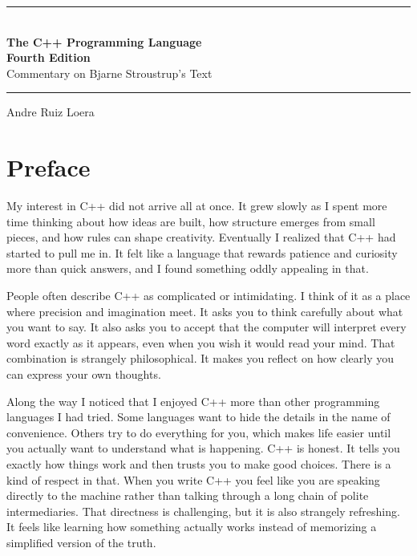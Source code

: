 \documentclass[12pt,letterpaper]{book}
\theoremstyle{definition}
\theoremstyle{remark}
\begin{document}
\begin{titlepage}
\begin{center}

\vspace*{4cm}

\rule{\textwidth}{1.5pt}\\[0.5cm]

{\Huge\bfseries The C++ Programming Language}\\[0.5cm]

{\Large\bfseries Fourth Edition}\\[0.3cm]

{\Large Commentary on Bjarne Stroustrup's Text}\\[0.5cm]

\rule{\textwidth}{1.5pt}

\vfill

{\LARGE Andre Ruiz Loera}

\vspace{3cm}

\end{center}
\end{titlepage}

\chapter*{Preface}

My interest in C++ did not arrive all at once. It grew slowly as I spent more time thinking about how ideas are built, how structure emerges from small pieces, and how rules can shape creativity. Eventually I realized that C++ had started to pull me in. It felt like a language that rewards patience and curiosity more than quick answers, and I found something oddly appealing in that.

People often describe C++ as complicated or intimidating. I think of it as a place where precision and imagination meet. It asks you to think carefully about what you want to say. It also asks you to accept that the computer will interpret every word exactly as it appears, even when you wish it would read your mind. That combination is strangely philosophical. It makes you reflect on how clearly you can express your own thoughts.

Along the way I noticed that I enjoyed C++ more than other programming languages I had tried. Some languages want to hide the details in the name of convenience. Others try to do everything for you, which makes life easier until you actually want to understand what is happening. C++ is honest. It tells you exactly how things work and then trusts you to make good choices. There is a kind of respect in that. When you write C++ you feel like you are speaking directly to the machine rather than talking through a long chain of polite intermediaries. That directness is challenging, but it is also strangely refreshing. It feels like learning how something actually works instead of memorizing a simplified version of the truth.
\end{document}
